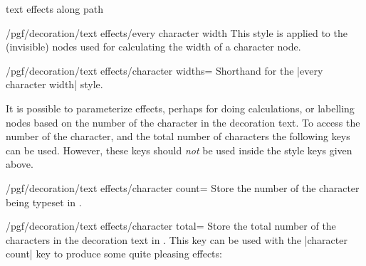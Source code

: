 \begin{decoration}{text effects along path}
    \begin{stylekey}{/pgf/decoration/text effects/every character width}
        This style is applied to the (invisible) nodes used for calculating the
        width of a character node.
    \end{stylekey}

    \begin{key}{/pgf/decoration/text effects/character widths=}
        Shorthand for the |every character width| style.
\begin{codeexample}[]
\end{codeexample}
    \end{key}

    It is possible to parameterize effects, perhaps for doing calculations, or
    labelling nodes based on the number of the character in the decoration
    text. To access the number of the character, and the total number of
    characters the following keys can be used. However, these keys should
    \emph{not} be used inside the style keys given above.

    \begin{key}{/pgf/decoration/text effects/character count=}
        Store the number of the character being typeset in .
\begin{codeexample}[]
\end{codeexample}
    \end{key}

    \begin{key}{/pgf/decoration/text effects/character total=}
        Store the total number of the characters in the decoration text in
        . This key can be used with the |character count| key to
        produce some quite pleasing effects:
\begin{codeexample}[]
\begin{tikzpicture}[decoration={text effects along path,
  text={text effects along path!},
  text effects/.cd,
    character count=\i, character total=\n,
    characters={text along path, evaluate={\c=\i/\n*100;},
      text=orange!\c!blue, scale=\i/\n+0.5}}]


\end{tikzpicture}
\end{codeexample}
\end{key}
\end{decoration}

